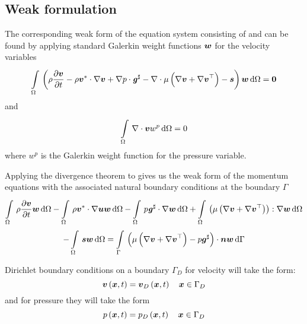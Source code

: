 \subsection{Weak formulation}

The corresponding weak form of the equation system consisting of
 and 
can be found by applying standard Galerkin weight functions $ \boldsymbol{w} $ for
the velocity variables \ie
\begin{equation}
  \gint{\Omega}{}{\pbrac{\rho\delby{\vectr{v}}{t}-\rho\dotprod{\vectr{v}^{*}}{\gradient{}{\vectr{v}}}
      +\dotprod{\gradient{}{p}}{\sharptensor{\tensor{g}}}
      -\divergence{}{\mu\pbrac{\gradient{}{\vectr{v}+\transpose{\gradient{}{\vectr{v}}}}}}
      -\vectr{s}}{\vectr{w}}}{\Omega} = \vectr{0}
  \label{eqn:WeakFormStokesGenMomentum}
\end{equation}
and 
\begin{equation}
  \gint{\Omega}{}{\divergence{}{\vectr{v}}w^{p}}{\Omega} = 0
 \label{eqn:WeakFormStokesGenMass}
\end{equation}
where $w^{p}$ is the Galerkin weight function for the pressure variable.

Applying the divergence theorem to 
gives us the weak form of the momentum equations with the associated natural
boundary conditions at the boundary $\Gamma$ \ie
\begin{multline}
  \gint{\Omega}{}{\rho\delby{\vectr{v}}{t}{\vectr{w}}}{\Omega}
  -\gint{\Omega}{}{\dotprod{\rho\vectr{v}^{*}}{\gradient{}{\vectr{u}}}\vectr{w}}{\Omega}
  -\gint{\Omega}{}{\dotprod{p\sharptensor{\tensor{g}}}{\gradient{}{\vectr{w}}}}{\Omega}
  +\gint{\Omega}{}{\doubledotprod{\pbrac{\mu\pbrac{\gradient{}{\vectr{v}}
          +\gradient{}{\transpose{\vectr{v}}}}}}{\gradient{}{\vectr{w}}}}{\Omega} \\
  -\gint{\Omega}{}{\vectr{s}\vectr{w}}{\Omega}
  =\gint{\Gamma}{}{\dotprod{\pbrac{\mu\pbrac{\gradient{}{\vectr{v}}+\transpose{\gradient{}{\vectr{v}}}}-
        p\sharptensor{\vectr{g}}}}{\vectr{n}}\vectr{w}}{\Gamma}
  \label{eqn:GalerkinStokesGenMomentum}
\end{multline}

Dirichlet boundary conditions on a boundary
$\Gamma_D$ for velocity will take the form:
\begin{equation}
  \fnof{\vectr{v}}{\vectr{x},t} = \fnof{\vectr{v}_{D}}{\vectr{x},t} \quad \vectr{x}\in\Gamma_{D}\\
  \label{eqn:StokesVelocityDirichletBC} 
\end{equation}
and for pressure they will take the form
\begin{equation}
  \fnof{p}{\vectr{x},t} = \fnof{p_{D}}{\vectr{x},t} \quad \vectr{x}\in\Gamma_{D}\\
  \label{eqn:StokesPressureDirichletBC} 
\end{equation}

